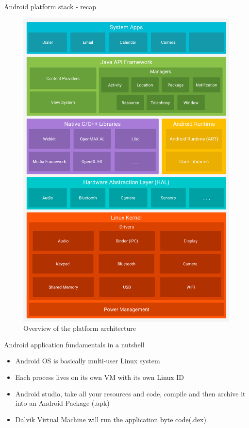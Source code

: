 \documentclass{beamer}
\begin{document}
    \begin{frame}{Android platform stack - recap}
    \begin{center}
        \begin{figure}
            \includegraphics[scale=.1]{android-stack}
            \caption{Overview of the platform architecture}
        \end{figure}
    \end{center}
\end{frame}
  
    \begin{frame}{Android application fundamentals in a nutshell}
     \begin{itemize}

    	\item Android OS is basically multi-user Linux system
    	\item Each process lives on its own VM with its own Linux ID
        \item Android studio, take all your resources and code, compile and then archive it into an Android Package (.apk)
        \item Dalvik Virtual Machine will run the application byte code(.dex)
	\end{itemize}
  \end{frame}
    
\end{document}
